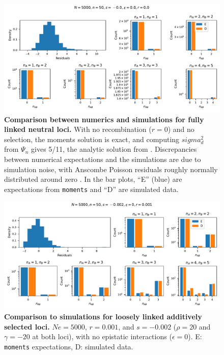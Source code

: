 \documentclass[]{article}
\begin{document}
\begin{figure}[ht!]
    \centering
    \includegraphics[width=\textwidth]{../simulations/discrete/plots/comp_Ne_5000_n_50_r_0.0_s_0.0_e_0.0.pdf}
    \caption{
        \textbf{Comparison between numerics and simulations for fully linked neutral loci.}
        With no recombination (\(r=0\)) and no selection, the moments solution is
        exact, and computing \(sigma_d^2\) from \(\Psi_n\) gives 5/11, the analytic
        solution from \citet{Ohta1969-ie}.
        Discrepancies between numerical expectations and the simulations are
        due to simulation noise, with Anscombe Poisson residuals roughly normally
        distributed around zero \citep{Pierce1986-um}.
        In the bar plots, ``E'' (blue) are expectations from \texttt{moments} and
        ``D'' are simulated data.
    }
    \label{fig:validation1}
\end{figure}

\begin{figure}[ht!]
    \centering
    \includegraphics[width=\textwidth]{../simulations/discrete/plots/comp_Ne_5000_n_50_r_0.001_s_0.002_e_0.pdf}
    \caption{
        \textbf{Comparison to simulations for loosely linked additively selected loci.}
        \(Ne=5000\), \(r=0.001\), and \(s=-0.002\) (\(\rho=20\) and \(\gamma=-20\)
        at both loci), with no epistatic interactions (\(\epsilon=0\)).
        E: \texttt{moments} expectations, D: simulated data.
    }
    \label{fig:validation2}
\end{figure}
\end{document}
